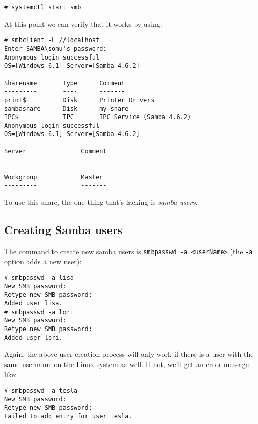 \vspace{-15pt}
\begin{verbatim}
# systemctl start smb
\end{verbatim}
\vspace{-10pt}	

\noindent
At this point we can verify that it works by using:

\vspace{-15pt}
\begin{verbatim}
# smbclient -L //localhost
Enter SAMBA\somu's password: 
Anonymous login successful
OS=[Windows 6.1] Server=[Samba 4.6.2]

Sharename       Type      Comment
---------       ----      -------
print$          Disk      Printer Drivers
sambashare      Disk      my share
IPC$            IPC       IPC Service (Samba 4.6.2)
Anonymous login successful
OS=[Windows 6.1] Server=[Samba 4.6.2]

Server               Comment
---------            -------

Workgroup            Master
---------            -------
\end{verbatim}
\vspace{-10pt}	

\noindent
To use this share, the one thing that's lacking is \textit{samba users}. 

\subsection{Creating Samba users}
The command to create new samba users is \verb|smbpasswd -a <userName>| (the \verb|-a| option adds a new user):

\vspace{-15pt}
\begin{verbatim}
# smbpasswd -a lisa
New SMB password:
Retype new SMB password:
Added user lisa.
# smbpasswd -a lori
New SMB password:
Retype new SMB password:
Added user lori.	
\end{verbatim}
\vspace{-10pt}	

\noindent
Again, the above user-creation process will only work if there is a user with the same username on the Linux system as well. If not, we'll get an error message like:

\vspace{-15pt}
\begin{verbatim}
# smbpasswd -a tesla
New SMB password:
Retype new SMB password:
Failed to add entry for user tesla.
\end{verbatim}
\vspace{-10pt}	

